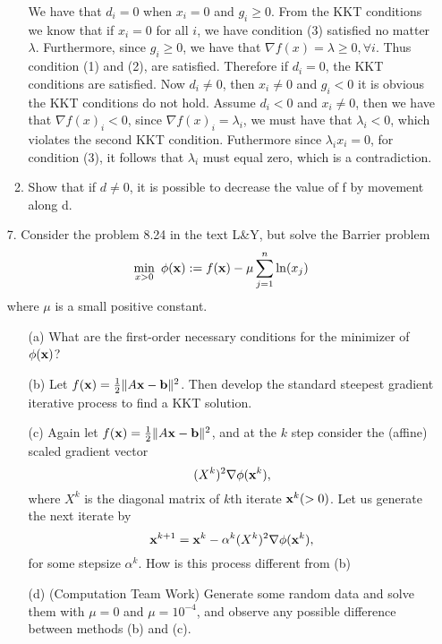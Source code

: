 \documentclass[12pt,letterpaper]{article}
\renewcommand\b{{\bf b}}
\newcommand\x{{\bf x}}
\begin{document}
\begin{enumerate}
\begin{enumerate}
We have that $d_i = 0$ when $x_i = 0$ and $g_i \geq 0$. From the KKT conditions we know that if $x_i = 0$ for all $i$, we have condition (3) satisfied no matter $\lambda$. Furthermore, since $g_i \geq 0$, we have that $\nabla f(x) = \lambda  \geq 0, \forall i$. Thus condition (1) and (2), are satisfied. Therefore if $d_i = 0$, the KKT conditions are satisfied.  Now $d_i \neq 0$, then  $x_i \neq 0$ and $g_i < 0$ it is obvious the KKT conditions do not hold. Assume $d_i < 0$ and $x_i \neq 0$, then we have that $\nabla f(x)_i < 0$, since $\nabla f(x)_i = \lambda_i$, we must have that $\lambda_i < 0$, which violates the second KKT condition. Futhermore since $\lambda_i x_i = 0$, for condition (3), it follows that $\lambda_i$ must equal zero, which is a contradiction. 

\item Show that if $d \neq 0$, it is possible to decrease the value of f by movement along d. 







\end{enumerate}



\item[7.] Consider the problem 8.24 in the text L\&Y, but solve the Barrier problem
\[\min_{x>0}\ \phi(\x):=f(\x)-\mu\sum_{j=1}^n\ln(x_j)\]
where $\mu$ is a small positive constant.
\begin{itemize}
\item[(a)] What are the first-order necessary conditions for the minimizer of $\phi(\x)$?

\item[(b)] Let $f(\x)=\frac{1}{2}\|A\x-\b\|^2$. Then develop the standard steepest gradient iterative process to find a KKT solution.

\item[(c)] Again let $f(\x)=\frac{1}{2}\|A\x-\b\|^2$, and at the $k$ step consider the (affine) scaled gradient vector
\[(X^k)^2\nabla\phi(\x^k),\]
where $X^k$ is the diagonal matrix of $k$th iterate $\x^k(>0)$. Let us generate the next iterate by
\[\x^{k+1}=\x^k-\alpha^k(X^k)^2\nabla\phi(\x^k),\]
for some stepsize $\alpha^k$. How is this process different from (b)

\item[(d)] (Computation Team Work) Generate some random data and solve them with $\mu=0$ and $\mu=10^{-4}$, and observe any possible difference between methods (b) and (c).
\end{itemize}


\end{enumerate}
\end{document}
